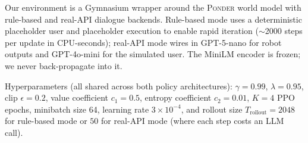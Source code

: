 Our environment is a Gymnasium \cite{towers2023gymnasium} wrapper around the \textsc{Ponder} world model with rule-based and real-API dialogue backends. Rule-based mode uses a deterministic placeholder user and placeholder execution to enable rapid iteration ($\sim$2000 steps per update in CPU-seconds); real-API mode wires in GPT-5-nano for robot outputs and GPT-4o-mini for the simulated user. The MiniLM encoder \cite{reimers2019sbert} is frozen; we never back-propagate into it.

Hyperparameters (all shared across both policy architectures): $\gamma = 0.99$, $\lambda = 0.95$, clip $\epsilon = 0.2$, value coefficient $c_1 = 0.5$, entropy coefficient $c_2 = 0.01$, $K = 4$ PPO epochs, minibatch size 64, learning rate $3\times 10^{-4}$, and rollout size $T_{\text{rollout}} = 2048$ for rule-based mode or $50$ for real-API mode (where each step costs an LLM call).
